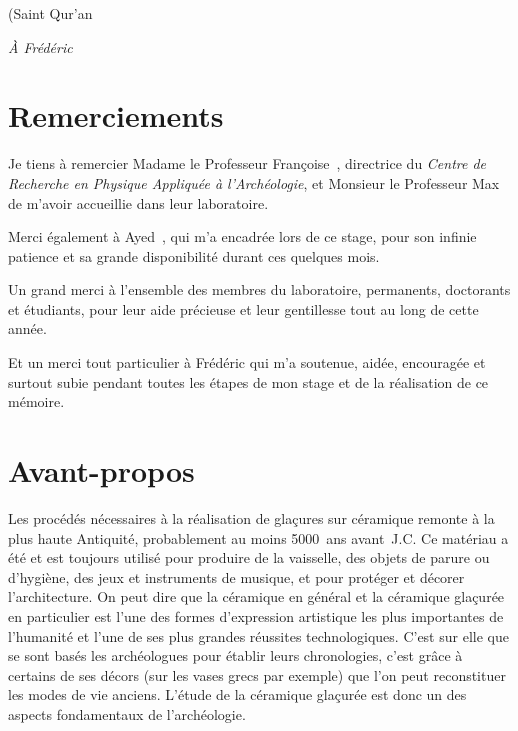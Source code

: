 
\begin{RaggedLeft}
  \itshape

  (Saint Qur'an
\end{RaggedLeft}


{\raggedleft\itshape À Frédéric \par}


\chapter*{Remerciements}

Je tiens à remercier Madame le Professeur Françoise~, 
directrice du \emph{Centre de Recherche en Physique Appliquée à 
l'Archéologie}, et Monsieur le Professeur Max~ 
de m'avoir accueillie dans leur laboratoire.

\bigskip

Merci également à Ayed~, qui m'a encadrée lors de ce 
stage, pour son infinie patience et sa grande disponibilité durant 
ces quelques mois.

\bigskip

Un grand merci à l'ensemble des membres du laboratoire, permanents, 
doctorants et étudiants, pour leur aide précieuse et leur gentillesse 
tout au long de cette année.

\bigskip

Et un merci tout particulier à Frédéric qui m'a soutenue, aidée, 
encouragée et surtout subie pendant toutes les étapes de mon stage 
et de la réalisation de ce mémoire.

\chapter*{Avant-propos}

Les procédés nécessaires à la réalisation de glaçures sur céramique 
remonte à la plus haute Antiquité, probablement au moins 
\num{5000}~ans avant~J.C. Ce matériau a été et est toujours utilisé 
pour produire de la vaisselle, des objets de parure ou d'hygiène, 
des jeux et instruments de musique, et pour protéger et décorer 
l'architecture. On peut dire que la céramique en général et la 
céramique glaçurée en particulier est l'une des formes d'expression 
artistique les plus importantes de l'humanité et l'une de ses plus 
grandes réussites technologiques. C'est sur elle que se sont basés les 
archéologues pour établir leurs chronologies, c'est grâce à certains 
de ses décors (sur les vases grecs par exemple) que l'on peut 
reconstituer les modes de vie anciens. L'étude de la céramique 
glaçurée est donc un des aspects fondamentaux de l'archéologie.

